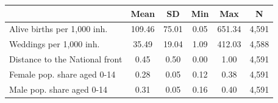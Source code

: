 {
\def\sym#1{\ifmmode^{#1}\else\(^{#1}\)\fi}
\begin{tabular}{l*{1}{ccccc}}
\toprule
                    &        Mean&          SD&         Min&         Max&           N\\
\midrule
Alive births per 1,000 inh.&      109.46&       75.01&        0.05&      651.34&       4,591\\
Weddings per 1,000 inh.&       35.49&       19.04&        1.09&      412.03&       4,588\\
Distance to the National front&        0.45&        0.50&        0.00&        1.00&       4,591\\
Female pop. share aged 0-14&        0.28&        0.05&        0.12&        0.38&       4,591\\
Male pop. share aged 0-14&        0.31&        0.05&        0.16&        0.40&       4,591\\
\bottomrule
\end{tabular}
}
